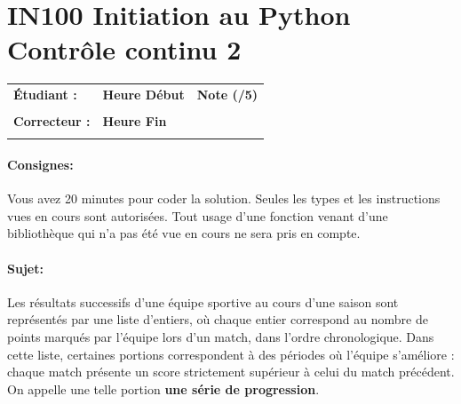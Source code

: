 \documentclass[a4paper,11pt]{article}
\begin{document}
\newtheorem{theo}{Theorem}
\newtheorem{coro}{Corollary}[theo]
\newtheorem{lemme}{Lemma}
\renewcommand{\thecoro}{\thetheo.\arabic{coro}}



\parindent=0cm


\section*{\center IN100 Initiation au Python\\
Contrôle continu 2}

\vspace{-0.3 cm}

\begin{table}[h!]
\centering
\renewcommand{\arraystretch}{1.4} %
\begin{tabular}{|p{10cm}|p{3cm}|p{2cm}|}
\hline
\textbf{Étudiant :} & \textbf{Heure Début }  & \textbf{Note (/5) }  \\
& & \\
\hline
\textbf{Correcteur :} & \textbf{Heure Fin } & \\
& & \\
\hline

\hline
\end{tabular}
\end{table}
\vspace{-0.4 cm}
\paragraph*{Consignes:} Vous avez 20 minutes pour coder la solution. Seules les types et les instructions vues en cours sont autorisées. Tout usage d'une fonction 
venant d'une bibliothèque qui n'a pas été vue en cours ne sera pris en compte. 

\vspace{-0.2 cm}
\vspace{-0.2 cm}
\paragraph*{Sujet:}

Les résultats successifs d’une équipe sportive au cours d’une saison sont représentés par une liste d’entiers, où chaque entier correspond au nombre de points marqués par l’équipe lors d’un match, dans l’ordre chronologique.
Dans cette liste, certaines portions correspondent à des périodes où l’équipe s’améliore : chaque match présente un score strictement supérieur à celui du match précédent.
On appelle une telle portion \textbf{une série de progression}.
\end{document}
